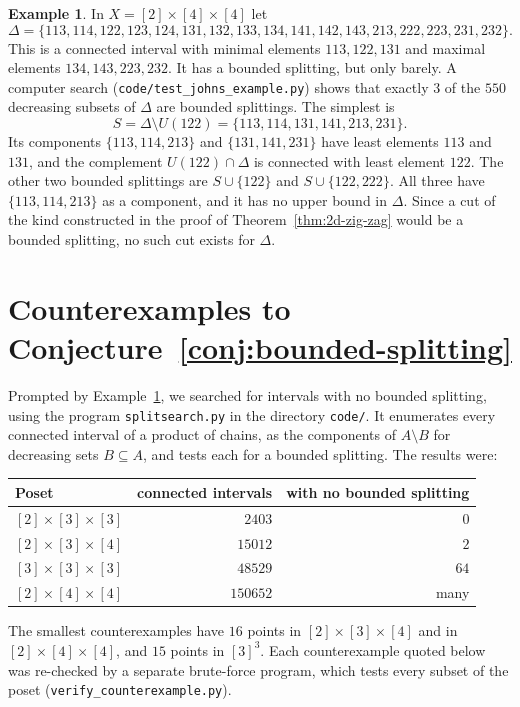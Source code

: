 \documentclass[10pt, a4paper]{article}
\theoremstyle{plain}
\theoremstyle{definition}
\newtheorem{example}[theorem]{Example}
\begin{document}
\begin{example}\label{ex:barely-splittable}
  In $X=[2]\times[4]\times[4]$ let
  \[
    \Delta=\{113,114,122,123,124,131,132,133,134,141,142,143,213,222,223,231,232\}.
  \]
  This is a connected interval with minimal elements $113,122,131$ and maximal
  elements $134,143,223,232$. It has a bounded splitting,
  but only barely. A computer search (\texttt{code/test\_johns\_example.py}) shows
  that exactly $3$ of the $550$ decreasing subsets of $\Delta$ are bounded splittings.
  The simplest is
  \[
    S=\Delta\setminus U(122)=\{113,114,131,141,213,231\}.
  \]
  Its components $\{113,114,213\}$ and $\{131,141,231\}$ have least elements $113$ and
  $131$, and the complement $U(122)\cap\Delta$ is connected with least element $122$.
  The other two bounded splittings are $S\cup\{122\}$ and $S\cup\{122,222\}$. All
  three have $\{113,114,213\}$ as a component, and it has no upper bound in $\Delta$.
  Since a cut of the kind constructed in the proof of
  Theorem~\ref{thm:2d-zig-zag} would be a bounded splitting, no such cut exists for
  $\Delta$.
\end{example}

\section{Counterexamples to Conjecture~\ref{conj:bounded-splitting}}\label{sec:counterexamples}

Prompted by Example~\ref{ex:barely-splittable}, we searched for intervals with no bounded
splitting, using the program \texttt{splitsearch.py} in the directory
\texttt{code/}. It enumerates every connected interval of a product of chains, as the components of $A\setminus B$ for decreasing sets
$B\subseteq A$, and tests each for a bounded splitting. The results were:
\begin{center}
  \begin{tabular}{lrr}
    \hline
    Poset & connected intervals & with no bounded splitting \\
    \hline
    $[2]\times[3]\times[3]$ & $2403$ & $0$ \\
    $[2]\times[3]\times[4]$ & $15012$ & $2$ \\
    $[3]\times[3]\times[3]$ & $48529$ & $64$ \\
    $[2]\times[4]\times[4]$ & $150652$ & many \\
    \hline
  \end{tabular}
\end{center}
The smallest counterexamples have $16$ points in $[2]\times[3]\times[4]$ and in
$[2]\times[4]\times[4]$, and $15$ points in $[3]^3$. Each counterexample quoted below was
re-checked by a separate brute-force program, which tests every subset of the
poset (\texttt{verify\_counterexample.py}).
\end{document}
